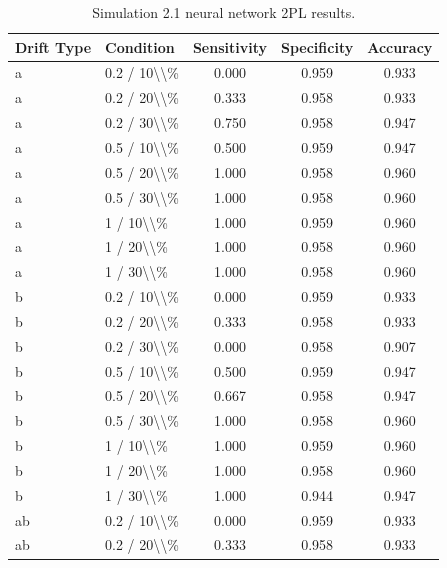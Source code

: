 \begin{table}[!h]
\centering
\caption{\label{tab:tab:sim21_nn_2pl}Simulation 2.1 neural network 2PL results.}
\centering
\begin{tabular}[t]{llccc}
\toprule
Drift Type & Condition & Sensitivity & Specificity & Accuracy\\
\midrule
a & 0.2 / 10\textbackslash{}\textbackslash{}\% & 0.000 & 0.959 & 0.933\\
a & 0.2 / 20\textbackslash{}\textbackslash{}\% & 0.333 & 0.958 & 0.933\\
a & 0.2 / 30\textbackslash{}\textbackslash{}\% & 0.750 & 0.958 & 0.947\\
a & 0.5 / 10\textbackslash{}\textbackslash{}\% & 0.500 & 0.959 & 0.947\\
a & 0.5 / 20\textbackslash{}\textbackslash{}\% & 1.000 & 0.958 & 0.960\\
\addlinespace
a & 0.5 / 30\textbackslash{}\textbackslash{}\% & 1.000 & 0.958 & 0.960\\
a & 1 / 10\textbackslash{}\textbackslash{}\% & 1.000 & 0.959 & 0.960\\
a & 1 / 20\textbackslash{}\textbackslash{}\% & 1.000 & 0.958 & 0.960\\
a & 1 / 30\textbackslash{}\textbackslash{}\% & 1.000 & 0.958 & 0.960\\
b & 0.2 / 10\textbackslash{}\textbackslash{}\% & 0.000 & 0.959 & 0.933\\
\addlinespace
b & 0.2 / 20\textbackslash{}\textbackslash{}\% & 0.333 & 0.958 & 0.933\\
b & 0.2 / 30\textbackslash{}\textbackslash{}\% & 0.000 & 0.958 & 0.907\\
b & 0.5 / 10\textbackslash{}\textbackslash{}\% & 0.500 & 0.959 & 0.947\\
b & 0.5 / 20\textbackslash{}\textbackslash{}\% & 0.667 & 0.958 & 0.947\\
b & 0.5 / 30\textbackslash{}\textbackslash{}\% & 1.000 & 0.958 & 0.960\\
\addlinespace
b & 1 / 10\textbackslash{}\textbackslash{}\% & 1.000 & 0.959 & 0.960\\
b & 1 / 20\textbackslash{}\textbackslash{}\% & 1.000 & 0.958 & 0.960\\
b & 1 / 30\textbackslash{}\textbackslash{}\% & 1.000 & 0.944 & 0.947\\
ab & 0.2 / 10\textbackslash{}\textbackslash{}\% & 0.000 & 0.959 & 0.933\\
ab & 0.2 / 20\textbackslash{}\textbackslash{}\% & 0.333 & 0.958 & 0.933\\

\end{tabular}
\end{table}
